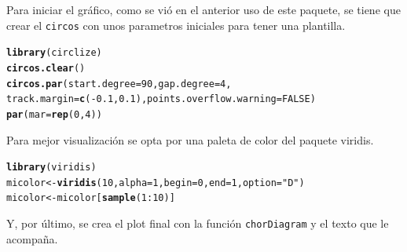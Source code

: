\documentclass{article}\usepackage[]{graphicx}\usepackage[]{color}
\makeatletter
\newcommand{\hlnum}[1]{\textcolor[rgb]{0.686,0.059,0.569}{#1}}%
\newcommand{\hlstr}[1]{\textcolor[rgb]{0.192,0.494,0.8}{#1}}%
\newcommand{\hlopt}[1]{\textcolor[rgb]{0,0,0}{#1}}%
\newcommand{\hlstd}[1]{\textcolor[rgb]{0.345,0.345,0.345}{#1}}%
\newcommand{\hlkwb}[1]{\textcolor[rgb]{0.69,0.353,0.396}{#1}}%
\newcommand{\hlkwc}[1]{\textcolor[rgb]{0.333,0.667,0.333}{#1}}%
\newcommand{\hlkwd}[1]{\textcolor[rgb]{0.737,0.353,0.396}{\textbf{#1}}}%
\newenvironment{kframe}{%
 \def\at@end@of@kframe{}%
 \ifinner\ifhmode%
  \def\at@end@of@kframe{\end{minipage}}%
  \begin{minipage}{\columnwidth}%
 \fi\fi%
 \def\FrameCommand##1{\hskip\@totalleftmargin \hskip-\fboxsep
 \colorbox{shadecolor}{##1}\hskip-\fboxsep
     \hskip-\linewidth \hskip-\@totalleftmargin \hskip\columnwidth}%
 \MakeFramed {\advance\hsize-\width
   \@totalleftmargin\z@ \linewidth\hsize
   \@setminipage}}%
 {\par\unskip\endMakeFramed%
 \at@end@of@kframe}
\newenvironment{knitrout}{}{} %
\makeatother
\begin{document}
Para iniciar el gr\'afico, como se vi\'o en el anterior uso de este paquete, se tiene que crear el \texttt{circos} con unos parametros iniciales para tener una plantilla.
\begin{knitrout}
\color{fgcolor}\begin{kframe}
\begin{alltt}
\hlkwd{library}\hlstd{(circlize)}
\hlkwd{circos.clear}\hlstd{()}
\hlkwd{circos.par}\hlstd{(}\hlkwc{start.degree} \hlstd{=} \hlnum{90}\hlstd{,} \hlkwc{gap.degree} \hlstd{=} \hlnum{4}\hlstd{,}
           \hlkwc{track.margin} \hlstd{=} \hlkwd{c}\hlstd{(}\hlopt{-}\hlnum{0.1}\hlstd{,} \hlnum{0.1}\hlstd{),} \hlkwc{points.overflow.warning} \hlstd{=} \hlnum{FALSE}\hlstd{)}
\hlkwd{par}\hlstd{(}\hlkwc{mar} \hlstd{=} \hlkwd{rep}\hlstd{(}\hlnum{0}\hlstd{,} \hlnum{4}\hlstd{))}
\end{alltt}
\end{kframe}
\end{knitrout}
Para mejor visualizaci\'on se opta por una paleta de color del paquete viridis.
\begin{knitrout}
\color{fgcolor}\begin{kframe}
\begin{alltt}
\hlkwd{library}\hlstd{(viridis)}
\hlstd{micolor} \hlkwb{<-} \hlkwd{viridis}\hlstd{(}\hlnum{10}\hlstd{,} \hlkwc{alpha} \hlstd{=} \hlnum{1}\hlstd{,} \hlkwc{begin} \hlstd{=} \hlnum{0}\hlstd{,} \hlkwc{end} \hlstd{=} \hlnum{1}\hlstd{,} \hlkwc{option} \hlstd{=} \hlstr{"D"}\hlstd{)}
\hlstd{micolor} \hlkwb{<-} \hlstd{micolor[}\hlkwd{sample}\hlstd{(}\hlnum{1}\hlopt{:}\hlnum{10}\hlstd{)]}
\end{alltt}
\end{kframe}
\end{knitrout}
Y, por \'ultimo, se crea el plot final con la funci\'on \texttt{chorDiagram} y el texto que le acompa\~na.
\end{document}
